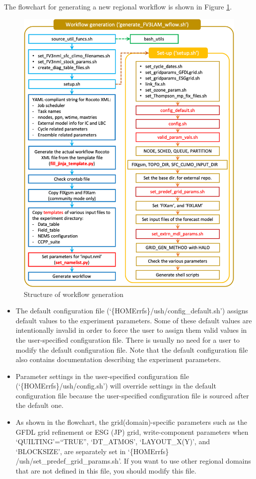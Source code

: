 \documentclass[11pt,fleqn]{report}              %
\begin{document}
\vspace{0.5cm}

The flowchart for generating a new regional workflow is shown in Figure \ref{fig:workflow_gen}.

\begin{figure}[ht!]
  \centering
  \includegraphics[width=0.8\linewidth]{Fv3regional_workflow_gen.png}
  \caption{Structure of workflow generation}
  \label{fig:workflow_gen}
\end{figure}

\begin{itemize}
\item The default configuration file (`\{HOMErrfs\}/ush/config\_default.sh') assigns default values to the experiment parameters.  Some of these default values are intentionally invalid in order to force the user to assign them valid values in the user-specified configuration file.  There is usually no need for a user to modify the default configuration file.  Note that the default configuration file also contains documentation describing the experiment parameters.

\item Parameter settings in the user-specified configuration file (`\{HOMErrfs\}/ush/config.sh') will override settings in the default configuration file because the user-specified configuration file is sourced after the default one.

\item As shown in the flowchart, the grid(domain)-specific parameters such as the GFDL grid refinement or ESG (JP) grid, write-component parameters when `QUILTING'=``TRUE'', `DT\_ATMOS', `LAYOUT\_X(Y)', and `BLOCKSIZE', are separately set in `\{HOMErrfs\} /ush/set\_predef\_grid\_params.sh'. If you want to use other regional domains that are not defined in this file, you should modify this file.

\end{itemize}
\end{document}
